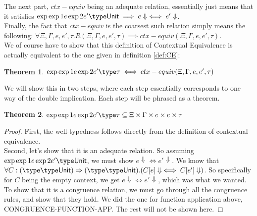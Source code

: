\documentclass[twoside,11pt,openright]{report}
\newtheorem{theorem}{Theorem}
\theoremstyle{definition}
\newcommand{\expr}{e}
\newcommand{\ctx}{C}
\newcommand{\Tunit}{\mathsf{Unit}}
\newcommand{\typ}{\tau}
\newcommand{\venv}{\Gamma}
\newcommand{\tenv}{\Xi}
\newcommand{\empvenv}{\bullet}
\newcommand{\emptenv}{\bullet}
\def\envstyp#1#2\type#3{#1 \; | \; #2 \; \vdash #3}
\def\envscteq#1#2\exp1#3\exp2#4\type#5
\def\envscteqgen#1#2\exp1#3\exp2#4\type#5
\begin{document}
The next part, $ctx-equiv$ being an adequate relation, essentially just means that it satisfies $\envscteqgen \empvenv \emptenv \exp1 \expr \exp2 \expr' \type \Tunit \implies \expr \Downarrow \iff \expr' \Downarrow$.\\
Finally, the fact that $ctx-equiv$ is the coarsest such relation simply means the following: $\forall \tenv, \venv, \expr, \expr', \typ . R(\tenv, \venv, \expr, \expr', \typ) \implies ctx-equiv(\tenv, \venv, \expr, \expr', \typ)$.\\
We of course have to show that this definition of Contextual Equivalence is actually equivalent to the one given in definition \ref{def:CE}:
\begin{theorem}\label{thm:CE_eq}
  $\envscteq \tenv \venv \exp1 \expr \exp2 \expr' \type \typ \iff ctx-equiv(\tenv, \venv, \expr, \expr', \typ)$
\end{theorem}
We will show this in two steps, where each step essentially corresponds to one way of the double implication. Each step will be phrased as a theorem.
\begin{theorem}\label{thm:CE_eq_part1}
  $\envscteq \tenv \venv \exp1 \expr \exp2 \expr' \type \typ \subseteq \tenv \times \venv \times \expr \times \expr \times \typ$\\
\end{theorem}
\begin{proof}
  First, the well-typedness follows directly from the definition of contextual equivalence.\\
  Second, let's show that it is an adequate relation. So assuming $\envscteq \empvenv \emptenv \exp1 \expr \exp2 \expr' \type \Tunit$, we must show $\expr \Downarrow \iff \expr' \Downarrow$. We know that $\forall \ctx : (\envstyp \emptenv \empvenv \type \Tunit) \Rightarrow (\envstyp {\emptenv} {\empvenv} \type \Tunit) . (\ctx[\expr] \Downarrow \iff \ctx[\expr'] \Downarrow)$. So specifically for $C$ being the empty context, we get $\expr \Downarrow \iff \expr' \Downarrow$, which was what we wanted.\\
  To show that it is a congruence relation, we must go through all the congruence rules, and show that they hold. We did the one for function application above, CONGRUENCE-FUNCTION-APP. The rest will not be shown here.
\end{proof}
\end{document}
